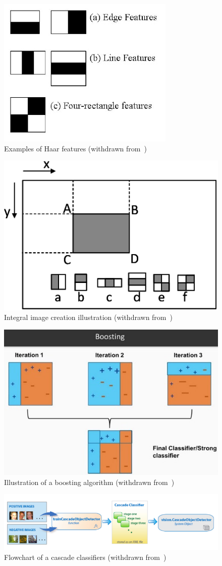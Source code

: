 %
\begin{figure}[htb!]
\centering
    \includegraphics[width=0.4\columnwidth]{./img/haar-features.jpg}
  \caption{Examples of Haar features (withdrawn from~\cite{opencv-haar-classif})}%
\label{fig:haar-features}
\end{figure}
%
\begin{figure}[htb!]
\centering
    \includegraphics[width=0.4\columnwidth]{./img/haar-integral.png}
  \caption{Integral image creation illustration (withdrawn from~\cite{haar-classif-explained})}%
\label{fig:haar-integral}
\end{figure}
%
\begin{figure}[htb!]
\centering
    \includegraphics[width=0.6\columnwidth]{./img/boosting.jpeg}
  \caption{Illustration of a boosting algorithm (withdrawn from~\cite{haar-classif-explained})}%
\label{fig:boosting}
\end{figure}
%
\begin{figure}[htb!]
\centering
    \includegraphics[width=1.0\columnwidth]{./img/cascade-implem.png}
  \caption{Flowchart of a cascade classifiers (withdrawn from~\cite{haar-classif-explained})}%
\label{fig:cascade-implem}
\end{figure}
%
